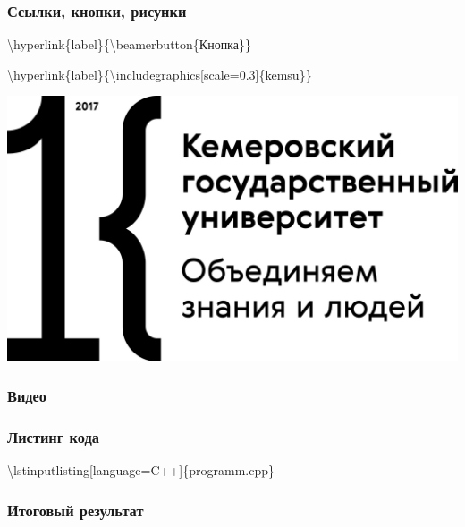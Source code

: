 \documentclass[russian, 14pt]{beamer}
\begin{document}
\begin{frame} \label{button}
	\frametitle{Ссылки, кнопки, рисунки}
	\textbackslash hyperlink\{label\}\{\textbackslash beamerbutton\{Кнопка\}\}
	
	
	\textbackslash hyperlink\{label\}\{\textbackslash includegraphics[scale=0.3]\{kemsu\}\}
	
	
	\centering\hyperlink{video}{\includegraphics[scale=0.3]{kemsu}}
\end{frame}

\begin{frame} \label{video}
	\frametitle{Видео}
\end{frame}

\begin{frame}
	\frametitle{Листинг кода}
	\begin{block}{}
		\textbackslash lstinputlisting[language=C++]\{programm.cpp\}
	\end{block}
	
\end{frame}

\begin{frame}
	\frametitle{Итоговый результат}
\end{frame}
\end{document}
